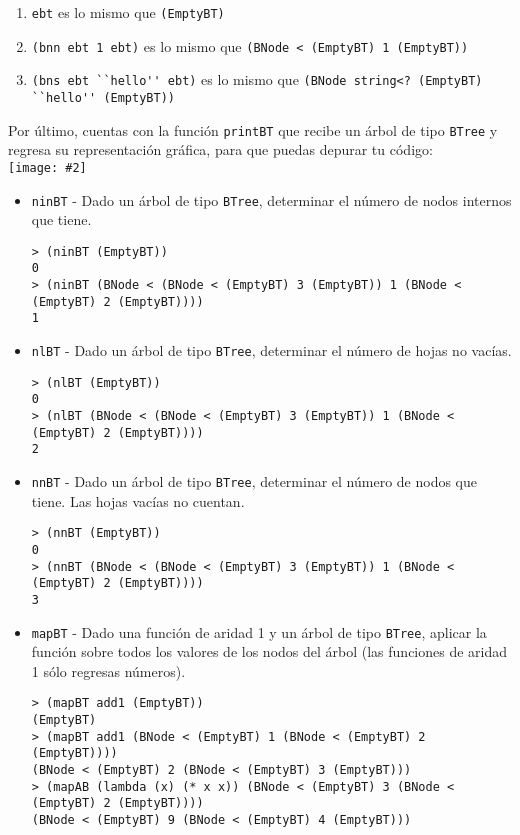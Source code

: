 \documentclass{article}
\newcommand{\jimage}[2]{\texttt{[image: \#2]}\vskip10pt}
\begin{document}
\begin{enumerate}
\item \verb;ebt; es lo mismo que \verb;(EmptyBT);
\item \verb;(bnn ebt 1 ebt); es lo mismo que \verb;(BNode < (EmptyBT) 1 (EmptyBT));
\item \verb;(bns ebt ``hello'' ebt); es lo mismo que \verb;(BNode string<? (EmptyBT) ``hello'' (EmptyBT));
\end{enumerate}

Por último, cuentas con la función \verb;printBT; que recibe un árbol de tipo \verb;BTree; y regresa su representación gráfica, para que puedas depurar tu código: \\

\jimage{0.9}{printbt1.png}

\begin{itemize}
\item \texttt{ninBT} - Dado un árbol de tipo \verb;BTree;, determinar el número de nodos internos que tiene.
\begin{verbatim}
> (ninBT (EmptyBT))
0
> (ninBT (BNode < (BNode < (EmptyBT) 3 (EmptyBT)) 1 (BNode < (EmptyBT) 2 (EmptyBT))))
1
\end{verbatim}

\item \texttt{nlBT} - Dado un árbol de tipo \verb;BTree;, determinar el número de hojas no vacías.
\begin{verbatim}
> (nlBT (EmptyBT))
0
> (nlBT (BNode < (BNode < (EmptyBT) 3 (EmptyBT)) 1 (BNode < (EmptyBT) 2 (EmptyBT))))
2
\end{verbatim}

\item \texttt{nnBT} - Dado un árbol de tipo \verb;BTree;, determinar el número de nodos que tiene. Las hojas vacías no cuentan.
\begin{verbatim}
> (nnBT (EmptyBT))
0
> (nnBT (BNode < (BNode < (EmptyBT) 3 (EmptyBT)) 1 (BNode < (EmptyBT) 2 (EmptyBT))))
3
\end{verbatim}

\item \texttt{mapBT} - Dado una función de aridad 1 y un árbol de tipo \verb;BTree;, aplicar la función sobre todos los valores de los nodos del árbol (las funciones de aridad 1 sólo regresas números).
\begin{verbatim}
> (mapBT add1 (EmptyBT))
(EmptyBT)
> (mapBT add1 (BNode < (EmptyBT) 1 (BNode < (EmptyBT) 2 (EmptyBT))))
(BNode < (EmptyBT) 2 (BNode < (EmptyBT) 3 (EmptyBT)))
> (mapAB (lambda (x) (* x x)) (BNode < (EmptyBT) 3 (BNode < (EmptyBT) 2 (EmptyBT))))
(BNode < (EmptyBT) 9 (BNode < (EmptyBT) 4 (EmptyBT)))
\end{verbatim}
\end{itemize}
\end{document}
